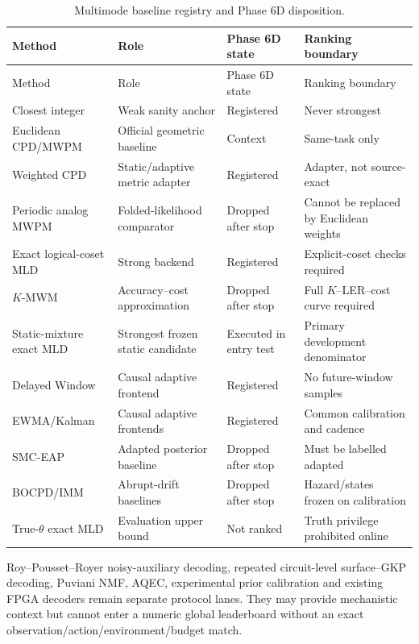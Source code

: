 \documentclass[11pt]{article}
\begin{document}
\begin{longtable}{@{}L{0.24\textwidth} L{0.22\textwidth} L{0.18\textwidth} L{0.28\textwidth}@{}}
\caption{Multimode baseline registry and Phase 6D disposition.}\label{tab:baselines}\\
\toprule
Method & Role & Phase 6D state & Ranking boundary \\
\midrule
\endfirsthead
\toprule
Method & Role & Phase 6D state & Ranking boundary \\
\midrule
\endhead
Closest integer & Weak sanity anchor & Registered & Never strongest \\
Euclidean CPD/MWPM & Official geometric baseline & Context & Same-task only \\
Weighted CPD & Static/adaptive metric adapter & Registered & Adapter, not source-exact \\
Periodic analog MWPM & Folded-likelihood comparator & Dropped after stop & Cannot be replaced by Euclidean weights \\
Exact logical-coset MLD & Strong backend & Registered & Explicit-coset checks required \\
$K$-MWM & Accuracy--cost approximation & Dropped after stop & Full $K$--LER--cost curve required \\
Static-mixture exact MLD & Strongest frozen static candidate & Executed in entry test & Primary development denominator \\
Delayed Window & Causal adaptive frontend & Registered & No future-window samples \\
EWMA/Kalman & Causal adaptive frontends & Registered & Common calibration and cadence \\
SMC-EAP & Adapted posterior baseline & Dropped after stop & Must be labelled adapted \\
BOCPD/IMM & Abrupt-drift baselines & Dropped after stop & Hazard/states frozen on calibration \\
True-$\theta$ exact MLD & Evaluation upper bound & Not ranked & Truth privilege prohibited online \\
\bottomrule
\end{longtable}

Roy--Pousset--Royer noisy-auxiliary decoding, repeated circuit-level
surface--GKP decoding, Puviani NMF, AQEC, experimental prior calibration and
existing FPGA decoders remain separate protocol lanes.  They may provide
mechanistic context but cannot enter a numeric global leaderboard without an
exact observation/action/environment/budget match.
\end{document}
